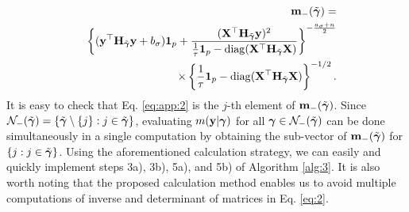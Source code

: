 \begin{eqnarray*}
&&{\bf m}_-({\tilde{{\boldsymbol \gamma}}}) =\\
&& \left\{({\bf y}^{{ \top}}{\bf H}_{\tilde{{\boldsymbol \gamma}}}{\bf y}+b_{\sigma}) {\boldsymbol 1}_p+\frac{({\bf X}^{{ \top}}{\bf H}_{\tilde{{\boldsymbol \gamma}}}{\bf y})^2}{\frac{1}{\tau}{\boldsymbol 1}_p-{\rm diag}({\bf X}^{{ \top}}{\bf H}_{\tilde{{\boldsymbol \gamma}}}{\bf X}) } \right\}^
 {-\frac{a_{\sigma}+n}{2}}\\
 &&\quad \times\left\{\frac{1}{\tau} {\boldsymbol 1}_p  -{\rm diag}({\bf X}^{{ \top}}{\bf H}_{\tilde{{\boldsymbol \gamma}}}{\bf X}) \right\}^{-1/2}.
 \end{eqnarray*}
It is easy to check that Eq. \eqref{eq:app:2} is the $j$-th element of ${\bf m}_-({\tilde{{\boldsymbol \gamma}}})$. Since $\mathcal{N}_-(\tilde{{\boldsymbol \gamma}})=\{\tilde{{\boldsymbol \gamma}} \setminus \{j\}:j\in \tilde{{\boldsymbol \gamma}} \}$, evaluating $m({\bf y}|{\boldsymbol \gamma})$ for all ${\boldsymbol \gamma} \in \mathcal{N}_-(\tilde{{\boldsymbol \gamma}} )$ can be done simultaneously in a single computation by obtaining the sub-vector of ${\bf m}_-({\tilde{{\boldsymbol \gamma}}})$ for $\{j :j \in \tilde{{\boldsymbol \gamma}} \}$. Using the aforementioned calculation strategy, we can easily and quickly implement steps 3a), 3b), 5a), and 5b) of Algorithm \ref{alg:3}. It is also worth noting that the proposed calculation method enables us to avoid multiple computations of inverse and determinant of matrices in Eq. \eqref{eq:2}.


